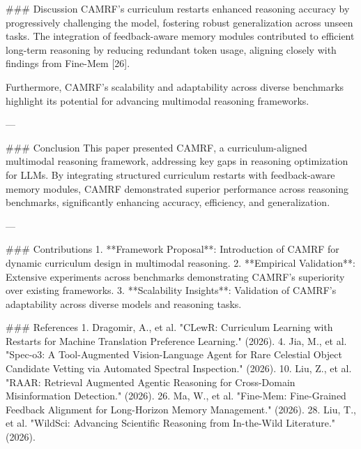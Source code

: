 ### Discussion  
CAMRF's curriculum restarts enhanced reasoning accuracy by progressively challenging the model, fostering robust generalization across unseen tasks. The integration of feedback-aware memory modules contributed to efficient long-term reasoning by reducing redundant token usage, aligning closely with findings from Fine-Mem [26].  

Furthermore, CAMRF's scalability and adaptability across diverse benchmarks highlight its potential for advancing multimodal reasoning frameworks.  

---

### Conclusion  
This paper presented CAMRF, a curriculum-aligned multimodal reasoning framework, addressing key gaps in reasoning optimization for LLMs. By integrating structured curriculum restarts with feedback-aware memory modules, CAMRF demonstrated superior performance across reasoning benchmarks, significantly enhancing accuracy, efficiency, and generalization.  

---

### Contributions  
1. **Framework Proposal**: Introduction of CAMRF for dynamic curriculum design in multimodal reasoning.  
2. **Empirical Validation**: Extensive experiments across benchmarks demonstrating CAMRF's superiority over existing frameworks.  
3. **Scalability Insights**: Validation of CAMRF's adaptability across diverse models and reasoning tasks.  

### References  
1. Dragomir, A., et al. "CLewR: Curriculum Learning with Restarts for Machine Translation Preference Learning." (2026).  
4. Jia, M., et al. "Spec-o3: A Tool-Augmented Vision-Language Agent for Rare Celestial Object Candidate Vetting via Automated Spectral Inspection." (2026).  
10. Liu, Z., et al. "RAAR: Retrieval Augmented Agentic Reasoning for Cross-Domain Misinformation Detection." (2026).  
26. Ma, W., et al. "Fine-Mem: Fine-Grained Feedback Alignment for Long-Horizon Memory Management." (2026).  
28. Liu, T., et al. "WildSci: Advancing Scientific Reasoning from In-the-Wild Literature." (2026).  

